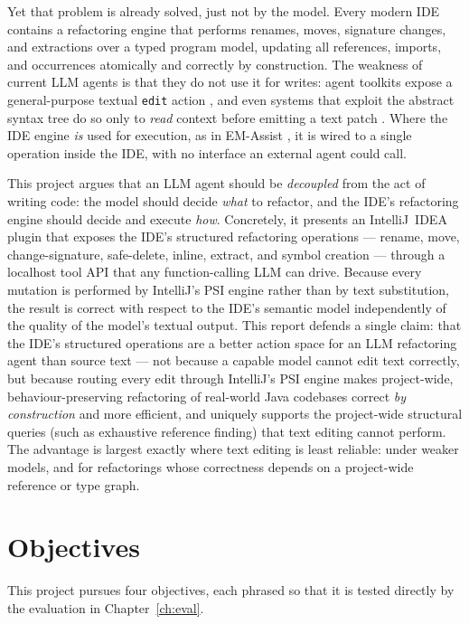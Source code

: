 Yet that problem is already solved, just not by the model. Every modern IDE
contains a refactoring engine that performs renames, moves, signature changes,
and extractions over a typed program model, updating all references, imports,
and occurrences atomically and correctly by construction. The weakness of
current LLM agents is that they do not use it for writes: agent toolkits expose a
general-purpose textual \texttt{edit} action \citep{sweagent2024}, and even
systems that exploit the abstract syntax tree do so only to \emph{read} context
before emitting a text patch \citep{autocoderover2024}. Where the IDE engine
\emph{is} used for execution, as in EM-Assist \citep{emassist2024}, it is wired
to a single operation inside the IDE, with no interface an external agent could
call.

This project argues that an LLM agent should be \emph{decoupled} from the act of
writing code: the model should decide \emph{what} to refactor, and the IDE's
refactoring engine should decide and execute \emph{how}. Concretely, it presents
an IntelliJ~IDEA plugin that exposes the IDE's structured refactoring operations
--- rename, move, change-signature, safe-delete, inline, extract, and symbol
creation --- through a localhost tool API that any function-calling LLM can
drive. Because every mutation is performed by IntelliJ's PSI engine rather than
by text substitution, the result is correct with respect to the IDE's semantic
model independently of the quality of the model's textual output.
This report defends a single claim: that the IDE's structured operations are a
better action space for an LLM refactoring agent than source text --- not because
a capable model cannot edit text correctly, but because routing every edit
through IntelliJ's PSI engine makes project-wide, behaviour-preserving refactoring
of real-world Java codebases correct \emph{by construction} and more efficient,
and uniquely supports the project-wide structural queries (such as exhaustive
reference finding) that text editing cannot perform. The advantage is largest
exactly where text editing is least reliable: under weaker models, and for
refactorings whose correctness depends on a project-wide reference or type graph.

\section{Objectives}
\label{sec:intro-objectives}
This project pursues four objectives, each phrased so that it is tested directly
by the evaluation in Chapter~\ref{ch:eval}.

